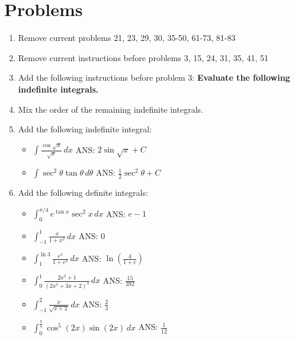 \documentclass[11pt]{report}
\begin{document}
\section*{Problems}
\begin{enumerate}

\item Remove current problems 21, 23, 29, 30, 35-50, 61-73, 81-83

\item Remove current instructions before problems 3, 15, 24, 31, 35, 41, 51

\item Add the following instructions before problem 3: {\bfseries Evaluate the following indefinite integrals.}

\item Mix the order of the remaining indefinite integrals.

\item Add the following indefinite integral:

\begin{itemize}
\item $\int \frac{\cos\sqrt x}{\sqrt x}\,dx$ \qquad ANS: $2\sin\sqrt x+C$
\item $\int \sec^2\theta\tan\theta\,d\theta$ \qquad ANS: $\frac12\sec^2\theta +C$
\end{itemize}

\item Add the following definite integrals:

\begin{itemize}
\item $\int_0^{\pi/4} e^{\tan x}\sec^2x\,dx$  \qquad ANS: $e-1$
\item $\int_{-1}^1 \frac{x}{1+x^2}\,dx$ \qquad ANS: $0$
\item $\int_1^{\ln 3} \frac{e^x}{1+e^x}\,dx$  \qquad ANS: $\ln\left( \frac{4}{1+e}\right)$ 
\item $\int_0^1 \frac{2x^2+1}{(2x^3+3x+2)^3}\,dx$  \qquad ANS: $\frac{15}{392}$
\item $\int_{-1}^2 \frac{x}{\sqrt{x+2}}\,dx$  \qquad ANS: $\frac23$
\item $\int_0^{\frac\pi4} \cos^5(2x)\sin(2x)\,dx$  \qquad ANS: $\frac{1}{12}$
\end{itemize}

\end{enumerate}
\end{document}

